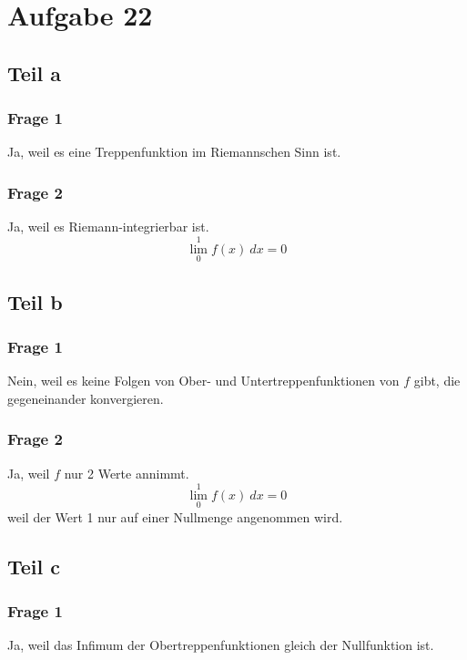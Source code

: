 \documentclass[10pt,a4paper]{article}
\begin{document}
\section{Aufgabe 22}

\subsection{Teil a}

\subsubsection{Frage 1}
Ja, weil es eine Treppenfunktion im Riemannschen Sinn ist.

\subsubsection{Frage 2}
Ja, weil es Riemann-integrierbar ist.
\begin{equation}
  \lim_{0}^{1} f(x)\ dx = 0
\end{equation}

\subsection{Teil b}

\subsubsection{Frage 1}
Nein, weil es keine Folgen von Ober- und Untertreppenfunktionen von $f$ gibt, die gegeneinander konvergieren.

\subsubsection{Frage 2}
Ja, weil $f$ nur 2 Werte annimmt.
\begin{equation}
  \lim_{0}^{1} f(x)\ dx = 0
\end{equation}
weil der Wert 1 nur auf einer Nullmenge angenommen wird.

\subsection{Teil c}

\subsubsection{Frage 1}
Ja, weil das Infimum der Obertreppenfunktionen gleich der Nullfunktion ist.
\end{document}
